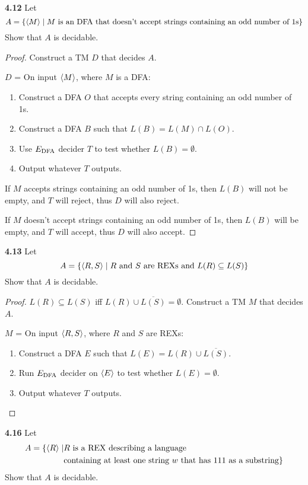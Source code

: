 \textbf{4.12} Let 
\[
A = \{ \langle{M}\rangle \mid \text{$M$ is an DFA that doesn't accept strings containing an odd number of 1s}\}
\]
Show that $A$ is decidable.
\begin{mdframed}
\begin{proof}
Construct a TM $D$ that decides $A$.

\medskip
$D$ = On input $\langle{M}\rangle$, where $M$ is a DFA:
\begin{enumerate}
\item Construct a DFA $O$ that accepts every string containing an odd number of 1s.
\item Construct a DFA $B$ such that $L(B) = L(M) \cap L(O)$.
\item Use $E_{\text{DFA}}$ decider $T$ to test whether $L(B) = \emptyset$.
\item Output whatever $T$ outputs.
\end{enumerate}

If $M$ accepts strings containing an odd number of 1s, then $L(B)$ will not be empty, and $T$ will reject, thus $D$ will also reject.

If $M$ doesn't accept strings containing an odd number of 1s, then $L(B)$ will be empty, and $T$ will accept, thus $D$ will also accept.
\end{proof}
\end{mdframed}

\textbf{4.13} Let 
\[
A = \{\langle{R,S}\rangle \mid \text{$R$ and $S$ are REXs and $L(R) \subseteq L(S)$}\}
\]
Show that $A$ is decidable.

\begin{mdframed}
\begin{proof}
$L(R) \subseteq L(S)$ iff $L(R) \cup \overline{L(S)} = \emptyset$. Construct a TM $M$ that decides $A$.

\medskip
$M$ = On input $\langle{R, S}\rangle$, where $R$ and $S$ are REXs:
\begin{enumerate}
\item Construct a DFA $E$ such that $L(E) = L(R) \cup \overline{L(S)}$.
\item Run $E_{\text{DFA}}$ decider on $\langle{E}\rangle$ to test whether $L(E) = \emptyset$.
\item Output whatever $T$ outputs.
\end{enumerate}
\end{proof}
\end{mdframed}

\textbf{4.16} Let
\begin{align*}
A = \{\langle{R}\rangle \mid &\text{$R$ is a REX describing a language} \\
& \text{containing at least one string $w$ that has 111 as a substring}\}
\end{align*}
Show that $A$ is decidable.

